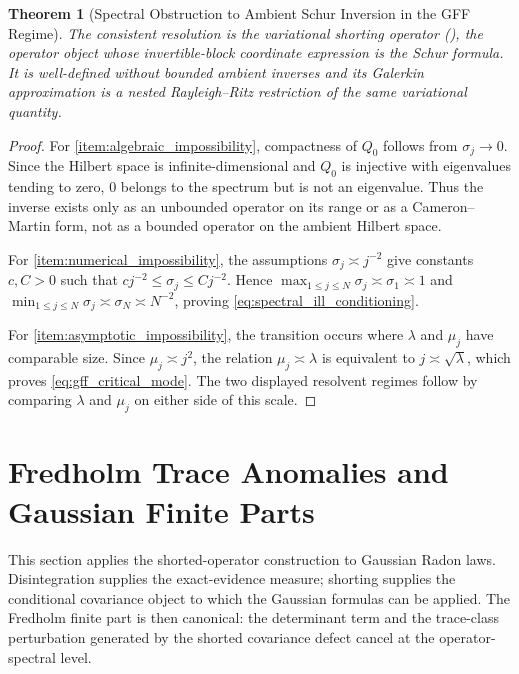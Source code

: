 \documentclass[preprint,12pt]{elsarticle}
\theoremstyle{plain}
\newtheorem{theorem}{Theorem}
\theoremstyle{definition}
\theoremstyle{remark}
\begin{document}
\begin{theorem}[Spectral Obstruction to Ambient Schur Inversion in the GFF Regime]
        The consistent resolution is the variational shorting operator
        (), the operator object whose invertible-block
        coordinate expression is the Schur formula.  It is well-defined without
        bounded ambient inverses and its Galerkin approximation is a nested
        Rayleigh--Ritz restriction of the same variational quantity.
    \end{theorem}

    \begin{proof}
        For \ref{item:algebraic_impossibility}, compactness of $Q_0$ follows from
        $\sigma_j\to0$.  Since the Hilbert space is infinite-dimensional and
        $Q_0$ is injective with eigenvalues tending to zero, $0$ belongs to the
        spectrum but is not an eigenvalue.  Thus the inverse exists only as an
        unbounded operator on its range or as a Cameron--Martin form, not as a
        bounded operator on the ambient Hilbert space.

        For \ref{item:numerical_impossibility}, the assumptions
        $\sigma_j\asymp j^{-2}$ give constants $c,C>0$ such that
        $cj^{-2}\le\sigma_j\le Cj^{-2}$.  Hence
        $\max_{1\le j\le N}\sigma_j\asymp \sigma_1\asymp1$ and
        $\min_{1\le j\le N}\sigma_j\asymp\sigma_N\asymp N^{-2}$, proving
        \eqref{eq:spectral_ill_conditioning}.

        For \ref{item:asymptotic_impossibility}, the transition occurs where
        $\lambda$ and $\mu_j$ have comparable size.  Since $\mu_j\asymp j^2$,
        the relation $\mu_j\asymp\lambda$ is equivalent to
        $j\asymp\sqrt{\lambda}$, which proves \eqref{eq:gff_critical_mode}.  The
        two displayed resolvent regimes follow by comparing $\lambda$ and
        $\mu_j$ on either side of this scale.
    \end{proof}

    \section{Fredholm Trace Anomalies and Gaussian Finite Parts}
    \label{sec:gaussian_zero}

    This section applies the shorted-operator construction to Gaussian Radon
    laws.  Disintegration supplies the exact-evidence measure; shorting supplies
    the conditional covariance object to which the Gaussian formulas can be
    applied.  The Fredholm finite part is then canonical: the determinant term
    and the trace-class perturbation generated by the shorted covariance defect
    cancel at the operator-spectral level.
\end{document}
